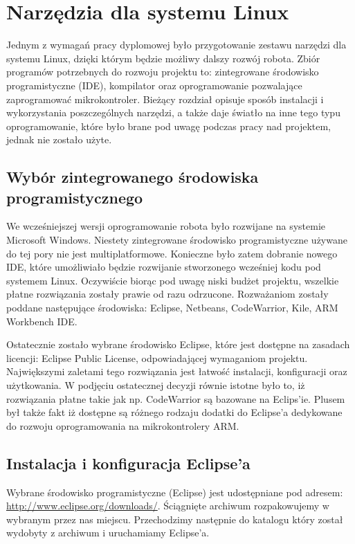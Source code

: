 \section{Narzędzia dla systemu Linux}
\label{sec:embeded-linux-tools}
Jednym z wymagań pracy dyplomowej było przygotowanie zestawu narzędzi dla systemu
Linux, dzięki którym będzie możliwy dalszy rozwój robota. Zbiór programów
potrzebnych do rozwoju projektu to: zintegrowane środowisko programistyczne
(IDE), kompilator oraz oprogramowanie pozwalające zaprogramować mikrokontroler.
Bieżący rozdział opisuje sposób instalacji i wykorzystania poszczególnych
narzędzi, a także daje światło na inne tego typu oprogramowanie, które było brane
pod uwagę podczas pracy nad projektem, jednak nie zostało użyte.

\subsection{Wybór zintegrowanego środowiska programistycznego}
We wcześniejszej wersji oprogramowanie robota było rozwijane na systemie
Microsoft Windows. Niestety zintegrowane środowisko programistyczne używane do
tej pory nie jest multiplatformowe. Konieczne było zatem dobranie nowego IDE,
które umożliwiało będzie rozwijanie stworzonego wcześniej kodu pod systemem
Linux. Oczywiście biorąc pod uwagę niski budżet projektu, wszelkie płatne
rozwiązania zostały prawie  od razu odrzucone. Rozważaniom zostały poddane
następujące środowiska: Eclipse, Netbeans, CodeWarrior, Kile, ARM Workbench IDE.

Ostatecznie zostało wybrane środowisko Eclipse, które jest dostępne na zasadach
licencji: Eclipse Public License, odpowiadającej wymaganiom projektu.
Największymi zaletami tego rozwiązania jest łatwość instalacji, konfiguracji oraz
użytkowania. W podjęciu ostatecznej decyzji równie istotne było to, iż
rozwiązania płatne takie jak np. CodeWarrior są bazowane na Eclips'ie. Plusem był
także fakt iż dostępne są różnego rodzaju dodatki do Eclipse'a dedykowane do
rozwoju oprogramowania na mikrokontrolery ARM.

\subsection{Instalacja i konfiguracja Eclipse'a}
\label{sec:eclipse-inst-conf}
Wybrane środowisko programistyczne (Eclipse) jest udostępniane pod adresem:
\url{http://www.eclipse.org/downloads/}. Ściągnięte archiwum rozpakowujemy w
wybranym przez nas miejscu. Przechodzimy następnie do katalogu który został
wydobyty z archiwum i uruchamiamy Eclipse'a.


